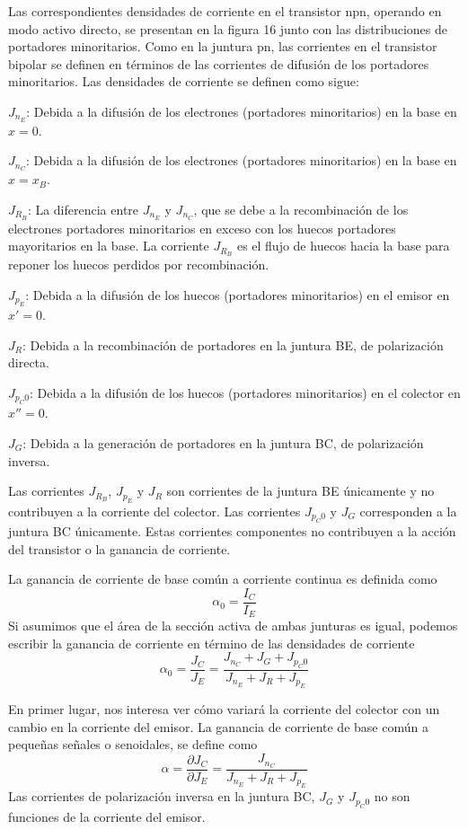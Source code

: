 \documentclass[12pt,a4paper]{article}
\begin{document}
Las correspondientes densidades de corriente en el transistor npn, operando en modo activo directo, se presentan en la figura 16 junto con las distribuciones de portadores minoritarios. Como en la juntura pn, las corrientes en el transistor bipolar se definen en términos de las corrientes de difusión de los portadores minoritarios. Las densidades de corriente se definen como sigue:

$J_{n_{E}}$: Debida a la difusión de los electrones (portadores minoritarios) en la base en $x=0$.

$J_{n_{C}}$: Debida a la difusión de los electrones (portadores minoritarios) en la base en $x=x_{B}$.

$J_{R_{B}}$: La diferencia entre $J_{n_{E}}$ y $J_{n_{C}}$, que se debe a la recombinación de los electrones portadores minoritarios en exceso con los huecos portadores mayoritarios en la base. La corriente $J_{R_{B}}$ es el flujo de huecos hacia la base para reponer los huecos perdidos por recombinación.

$J_{p_{E}}$: Debida a la difusión de los huecos (portadores minoritarios) en el emisor en $x'=0$.

$J_{R}$: Debida a la recombinación de portadores en la juntura BE, de polarización directa.

$J_{p_{C}0}$: Debida a la difusión de los huecos (portadores minoritarios) en el colector en $x''=0$.

$J_{G}$: Debida a la generación de portadores en la juntura BC, de polarización inversa.

Las corrientes $J_{R_{B}}$, $J_{p_{E}}$ y $J_{R}$ son corrientes de la juntura BE únicamente y no contribuyen a la corriente del colector. Las corrientes $J_{p_{C}0}$ y $J_{G}$ corresponden a la juntura BC únicamente. Estas corrientes componentes no contribuyen a la acción del transistor o la ganancia de corriente.

La ganancia de corriente de base común a corriente continua es definida como
\[ \alpha _{0}=\frac{I_{C}}{I_{E}} \]
Si asumimos que el área de la sección activa de ambas junturas es igual, podemos escribir la ganancia de corriente en término de las densidades de corriente
\[ \alpha _{0}=\frac{J_{C}}{J_{E}}=\frac{J_{n_{C}}+J_{G}+J_{p_{C}0}}{J_{n_{E}}+J_{R}+J_{p_{E}}} \]

En primer lugar, nos interesa ver cómo variará la corriente del colector con un cambio en la corriente del emisor. La ganancia de corriente de base común a pequeñas señales o senoidales, se define como
\[ \alpha = \frac{\partial J_{C}}{\partial J_{E}}=\frac{J_{n_{C}}}{J_{n_{E}}+J_{R}+J_{p_{E}}} \]
Las corrientes de polarización inversa en la juntura BC, $J_{G}$ y $J_{p_{C}0}$ no son funciones de la corriente del emisor.
\end{document}
